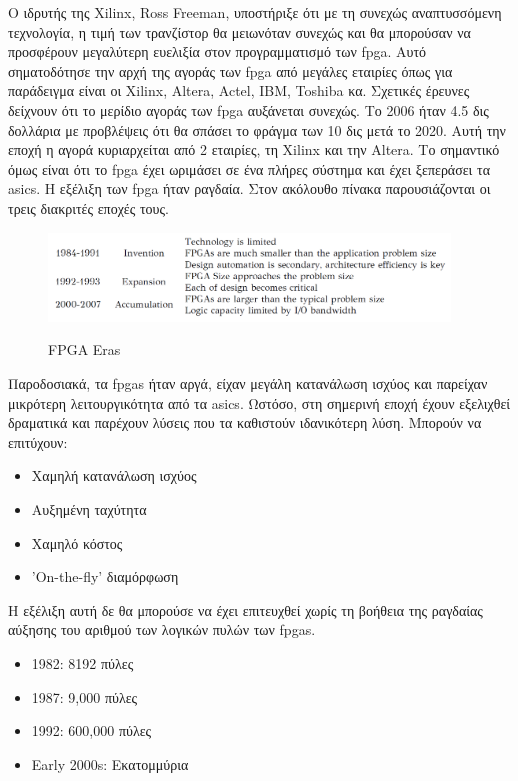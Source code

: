 Ο ιδρυτής της Xilinx, Ross Freeman, υποστήριξε ότι με τη συνεχώς αναπτυσσόμενη τεχνολογία, η τιμή των τρανζίστορ θα μειωνόταν συνεχώς και θα μπορούσαν να προσφέρουν μεγαλύτερη ευελιξία στον προγραμματισμό των \gls{fpga}. Αυτό σηματοδότησε την αρχή της αγοράς των \gls{fpga} από μεγάλες εταιρίες όπως για παράδειγμα είναι οι Xilinx, Altera, Actel, IBM, Toshiba κα. Σχετικές έρευνες δείχνουν ότι το μερίδιο αγοράς των \gls{fpga} αυξάνεται συνεχώς. Το 2006 ήταν 4.5 δις δολλάρια με προβλέψεις ότι θα σπάσει το φράγμα των 10 δις μετά το 2020. Αυτή την εποχή η αγορά κυριαρχείται από 2 εταιρίες, τη Xilinx και την Altera. Το σημαντικό όμως είναι ότι το \gls{fpga} έχει ωριμάσει σε ένα πλήρες σύστημα και έχει ξεπεράσει τα \gls{asic}s. Η εξέλιξη των \gls{fpga} ήταν ραγδαία. Στον ακόλουθο πίνακα παρουσιάζονται οι τρεις διακριτές εποχές τους.

\begin{figure}[H]
    \centering
  \includegraphics[width=0.95\textwidth]{images/eras}\\
  \caption{FPGA Eras}
\end{figure}

Παροδοσιακά, τα \gls{fpga}s ήταν αργά, είχαν μεγάλη κατανάλωση ισχύος και παρείχαν μικρότερη λειτουργικότητα από τα \gls{asic}s. Ωστόσο, στη σημερινή εποχή έχουν εξελιχθεί δραματικά και παρέχουν λύσεις που τα καθιστούν ιδανικότερη λύση. Μπορούν να επιτύχουν:
\begin{itemize}
	\item Χαμηλή κατανάλωση ισχύος
	\item Αυξημένη ταχύτητα
	\item Χαμηλό κόστος
	\item 'On-the-fly' διαμόρφωση \\
\end{itemize}

Η εξέλιξη αυτή δε θα μπορούσε να έχει επιτευχθεί χωρίς τη βοήθεια της ραγδαίας αύξησης του αριθμού των λογικών πυλών των \gls{fpga}s.
\begin{itemize}
	\item 1982: 8192 πύλες
	\item 1987: 9,000 πύλες
	\item 1992: 600,000 πύλες
	\item Early 2000s: Εκατομμύρια \\
\end{itemize}

